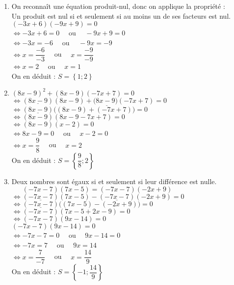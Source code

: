 \documentclass[a4paper,11pt,exos]{nsi} %
\begin{document}
\begin{enumerate}
    \item On reconnaît une équation produit-nul, donc on applique la propriété :\\
    {\color[HTML]{f15929}Un produit est nul si et seulement si au moins un de ses facteurs est nul.}\\$(-3x+6)(-9x+9)=0$\\$\iff -3x+6=0\quad$ ou $\quad-9x+9=0$\\$\iff -3x=-6\quad$ ou $\quad -9x=-9$\\$\iff x=\dfrac{-6}{-3}\quad$ ou $\quad x=\dfrac{-9}{-9}$\\$\iff x=2\quad$ ou $\quad x=1$\\On en déduit :  $S=\left\{1;2\right\}$

    \item  $(8x-9)^{2}+(8x-9)(-7x+7)=0$\\ $\iff (\underline{8x-9})(8x-9)+(\underline{8x-9)}( -7x+7)=0$\\ $\iff (\underline{8x-9})\Big((8x-9)+(-7x+7)\Big)=0$\\ $\iff (8x-9)( 8x-9-7x+7)=0$\\ $\iff (8x-9)( x-2)=0$\\$\iff 8x-9=0\quad$ ou $\quad x-2=0$\\$\iff x=\dfrac{9}{8}\quad$ ou $\quad x=2$\\
    On en déduit :  $S=\left\{\dfrac{9}{8};2\right\}$

    \item Deux nombres sont égaux si et seulement si leur différence est nulle.\\$\phantom{\iff}(-7x-7)(7x-5)=(-7x-7)(-2x+9)$\\$\iff (\underline{-7x-7})(7x-5)-(\underline{-7x-7})(-2x+9)=0$\\$\iff (\underline{-7x-7})\Big((7x-5)-(-2x+9)\Big)=0$\\$\iff (-7x-7)(7x-5+2x-9)=0$\\$\iff (-7x-7)(9x-14)=0$\\$(-7x-7)(9x-14)=0$\\$\iff -7x-7=0\quad$ ou $\quad 9x-14=0$\\$\iff -7x=7\quad$ ou $\quad 9x=14$\\$\iff x=\dfrac{7}{-7}\quad$ ou $\quad x=\dfrac{14}{9}$\\On en déduit :  $S=\left\{-1;\dfrac{14}{9}\right\}$
\end{enumerate}
\end{document}
